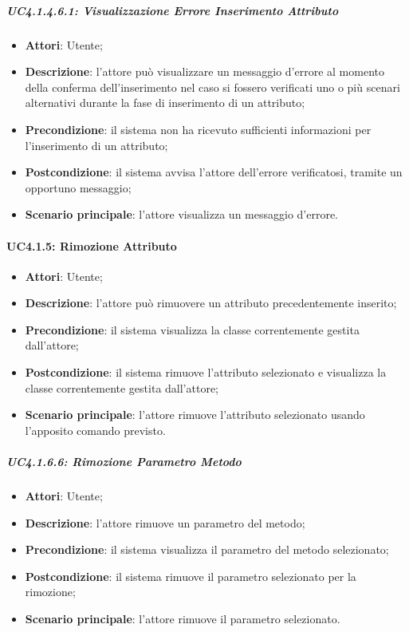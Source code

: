 \begin{itemize}
\begin{itemize}
\begin{itemize}
\begin{itemize}
\subparagraph{UC4.1.4.6.1: Visualizzazione Errore Inserimento Attributo}
\label{UC4.1.4.6.1}
\begin{itemize}
	\item \textbf{Attori}: Utente;
	\item \textbf{Descrizione}: l'attore può visualizzare un messaggio d'errore al momento della conferma dell'inserimento nel caso si fossero verificati uno o più scenari alternativi durante la fase di inserimento di un attributo;
	\item \textbf{Precondizione}: il sistema non ha ricevuto sufficienti informazioni per l'inserimento di un attributo;
	\item \textbf{Postcondizione}: il sistema avvisa l'attore dell'errore verificatosi, tramite un opportuno messaggio;
	\item \textbf{Scenario principale}: l'attore visualizza un messaggio d'errore.
\end{itemize}

\paragraph{UC4.1.5: Rimozione Attributo}
\label{UC4.1.5}
\begin{itemize}
	\item \textbf{Attori}: Utente;
	\item \textbf{Descrizione}: l'attore può rimuovere un attributo precedentemente inserito;
	\item \textbf{Precondizione}: il sistema visualizza la classe correntemente gestita dall'attore;
	\item \textbf{Postcondizione}: il sistema rimuove l'attributo selezionato e visualizza la classe correntemente gestita dall'attore;
	\item \textbf{Scenario principale}: l'attore rimuove l'attributo selezionato usando l'apposito comando previsto.
\end{itemize}



\subparagraph{UC4.1.6.6: Rimozione Parametro Metodo}
\label{UC4.1.6.6}
\begin{itemize}
	\item \textbf{Attori}: Utente;
	\item \textbf{Descrizione}: l'attore rimuove un parametro del metodo;
	\item \textbf{Precondizione}: il sistema visualizza il parametro del metodo selezionato;
	\item \textbf{Postcondizione}: il sistema rimuove il parametro selezionato per la rimozione;
	\item \textbf{Scenario principale}: l'attore rimuove il parametro selezionato.
\end{itemize}


\end{itemize}
\end{itemize}
\end{itemize}
\end{itemize}
